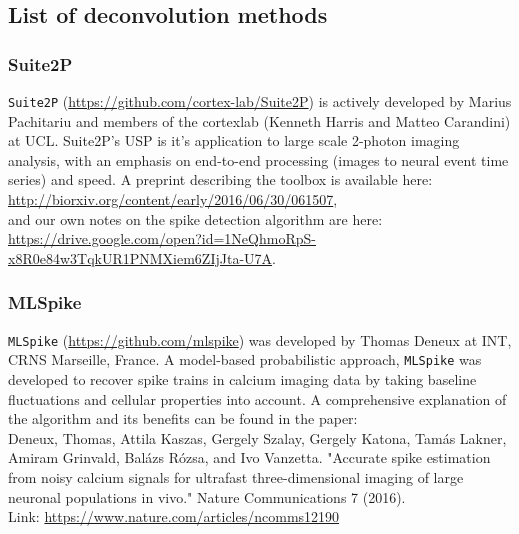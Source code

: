 \documentclass[a4paper,10pt,twocolumn]{article}
\begin{document}
\subsection*{List of deconvolution methods}
\subsubsection*{Suite2P}
\texttt{Suite2P} (\href{https://github.com/cortex-lab/Suite2P}{https://github.com/cortex-lab/Suite2P}) is actively developed by  Marius Pachitariu and members of the cortexlab (Kenneth Harris and Matteo Carandini) at UCL. Suite2P's USP is it's application to large scale 2-photon imaging analysis, with an emphasis on end-to-end processing (images to neural event time series) and speed. A preprint describing the toolbox is available here:\\

\noindent \href{http://biorxiv.org/content/early/2016/06/30/061507}{http://biorxiv.org/content/early/2016/06/30/061507}, \\

\noindent and our own notes on the spike detection algorithm are here:\\

\noindent \href{https://drive.google.com/open?id=1NeQhmoRpS-x8R0e84w3TqkUR1PNMXiem6ZIjJta-U7A}{https://drive.google.com/open?id=1NeQhmoRpS-x8R0e84w3TqkUR1PNMXiem6ZIjJta-U7A}.

\subsubsection*{MLSpike}
\texttt{MLSpike} (\href{https://github.com/mlspike}{https://github.com/mlspike}) was developed by Thomas Deneux at INT, CRNS Marseille, France. A model-based probabilistic approach, \texttt{MLSpike} was developed to recover spike trains in calcium imaging data by taking baseline fluctuations and cellular properties into account. A comprehensive explanation of the algorithm and its benefits can be found in the paper:\\

\noindent Deneux, Thomas, Attila Kaszas, Gergely Szalay, Gergely Katona, Tamás Lakner, Amiram Grinvald, Balázs Rózsa, and Ivo Vanzetta. "Accurate spike estimation from noisy calcium signals for ultrafast three-dimensional imaging of large neuronal populations in vivo." Nature Communications 7 (2016).\\

\noindent Link: \href{https://www.nature.com/articles/ncomms12190}{https://www.nature.com/articles/ncomms12190}
\end{document}
